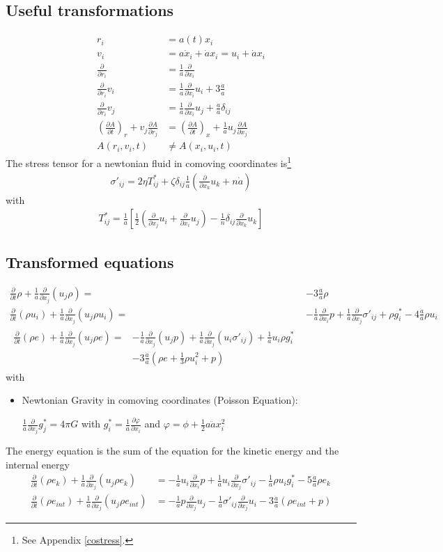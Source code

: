 \documentclass[a4paper,
					12pt,
					twoside,
					pagesize,
					cleardoubleplain,
					headsepline,
					bibtotoc
					]{scrbook}
\newcommand{\lra}[1]{{ \left( #1 \right) }}
\newcommand{\lrb}[1]{{ \left[ #1 \right] }}
\newcommand{\pd}[1]{\frac{\partial}{\partial #1}}
\newcommand{\fa}{\frac{1}{a}}
\newcommand{\fh}{\frac{\dot{a}}{a}}
\begin{document}
\subsection{Useful transformations}
\begin{align}
r_i&=a(t) x_i\\
v_i&= a \dot{x}_i + \dot{a} x_i = u_i + \dot{a} x_i\\
\pd{r_i}&=\fa\pd{x_i}\\
\pd{r_i}v_i&=\fa\pd{x_i}u_i+3\fh\label{eq:cotrans4}\\
\pd{r_i}v_j&=\fa\pd{x_i}u_j + \fh\delta_{ij} \label{eq:cotrans5}\\
\lra{\frac{\partial A}{\partial t}}_r+v_j \frac{\partial A}{\partial r_j} &= 
\lra{\frac{\partial A}{\partial t}}_x+\fa u_j \frac{\partial A}{\partial
x_j}\\
A(r_i,v_i,t) &\neq A(x_i,u_i,t)
\end{align}
The stress tensor for a newtonian fluid in comoving coordinates is\footnote{See
Appendix \ref{costress}.}
\begin{align}
\sigma'_{ij}=2\eta T^*_{ij}+\zeta\delta_{ij}\fa\lra{\pd{x_k}u_k+n\dot{a}}
\end{align}
with 
\begin{align}
T^*_{ij}=\fa\lrb{\frac{1}{2}\lra{\pd{x_j}u_i+\pd{x_i}u_j}
-\frac{1}{n}\delta_{ij}\pd{x_k}u_k}
\end{align}

\subsection{Transformed equations}
\begin{align}
\pd{t}\rho + \fa\pd{x_j}(u_j \rho) =& -3\fh\rho  \\
\pd{t}(\rho u_i) + \fa\pd{x_j}(u_j \rho u_i) =& 
-\fa\pd{x_i}p + \fa\pd{x_j}\sigma'_{ij} +\rho g^*_i -4\fh \rho u_i
\label{eq:commom}
\\
\begin{split}
\pd{t}(\rho e) + \fa\pd{x_j}(u_j \rho e) =& 
-\fa\pd{x_j}(u_j p) + \fa\pd{x_j}(u_i \sigma'_{ij}) + \fa u_i \rho g^*_i \\ 
&- 3 \fh(\rho e +\frac{1}{3}\rho u^2_i+p)\label{eq:cometot}
\end{split}
\end{align}
with
\begin{itemize}
\item Newtonian Gravity in comoving coordinates (Poisson Equation):
 
$\fa\pd{x_j}g^*_j=4\pi G$
with
$g_i^*=\fa\frac{\partial \varphi}{\partial x_i}$ and
$\varphi=\phi+\frac{1}{2}a\ddot{a}x_i^2$
\end{itemize}
The energy equation is the sum of the equation for the kinetic energy and the
internal energy
\begin{align}
\pd{t}(\rho e_k)+\fa\pd{x_j}(u_j \rho e_k) &= -\fa u_i \pd{x_i}p
+\fa u_i \pd{x_j}\sigma'_{ij}-\fa\rho u_i g^*_i-5\fh\rho e_k\\
\pd{t}(\rho e_{int})+\fa\pd{x_j}(u_j \rho e_{int})&=
-\fa p \pd{x_j}u_j -\fa \sigma'_{ij}\pd{x_j}u_i- 3\fh(\rho e_{int} +p)
\end{align}
\end{document}
